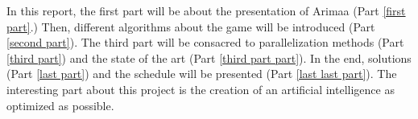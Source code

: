 In this report, the first part will be about the presentation of Arimaa (Part \ref{first part}.) Then, different algorithms about the game will be introduced (Part \ref{second part}). The third part will be consacred to parallelization methods (Part \ref{third part}) and the state of the art (Part \ref{third part part}). In the end, solutions (Part \ref{last part}) and the schedule will be presented (Part \ref{last last part}).
The interesting part about this project is the creation of an artificial intelligence as optimized as possible.